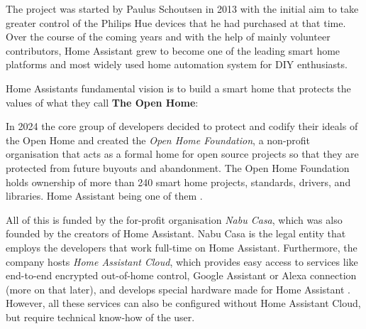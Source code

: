 The project was started by Paulus Schoutsen in 2013 with the initial aim to take greater control of the Philips Hue devices that he had purchased at that time. Over the course of the coming years and with the help of mainly volunteer contributors, Home Assistant grew to become one of the leading smart home platforms \cite{OpenHomeFoundation_About} and most widely used home automation system for DIY enthusiasts.

Home Assistants fundamental vision is to build a smart home that protects the values of what they call \textbf{The Open Home}:


In 2024 the core group of developers decided to protect and codify their ideals of the Open Home and created the \textit{Open Home Foundation}, a non-profit organisation that acts as a formal home for open source projects so that they are protected from future buyouts and abandonment. The Open Home Foundation holds ownership of more than 240 smart home projects, standards, drivers, and libraries. Home Assistant being one of them \cite{OpenHomeFoundation_About}.

All of this is funded by the for-profit organisation \textit{Nabu Casa}, which was also founded by the creators of Home Assistant. Nabu Casa is the legal entity that employs the developers that work full-time on Home Assistant. Furthermore, the company hosts \textit{Home Assistant Cloud}, which provides easy access to services like end-to-end encrypted out-of-home control, Google Assistant or Alexa connection (more on that later), and develops special hardware made for Home Assistant \cite{NabuCasa_Startpage}. However, all these services can also be configured without Home Assistant Cloud, but require technical know-how of the user.

